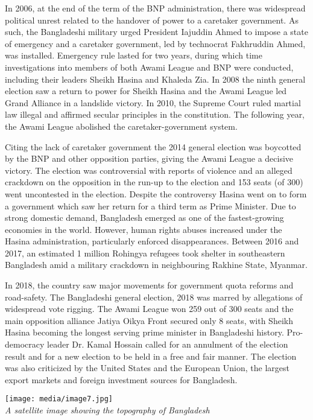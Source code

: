 In 2006, at the end of the term of the BNP administration, there was
widespread political unrest related to the handover of power to a
caretaker government. As such, the Bangladeshi military urged President
Iajuddin Ahmed to impose a state of emergency and a caretaker
government, led by technocrat Fakhruddin Ahmed, was installed. Emergency
rule lasted for two years, during which time investigations into members
of both Awami League and BNP were conducted, including their leaders
Sheikh Hasina and Khaleda Zia. In 2008 the ninth general election saw a
return to power for Sheikh Hasina and the Awami League led Grand
Alliance in a landslide victory. In 2010, the Supreme Court ruled
martial law illegal and affirmed secular principles in the constitution.
The following year, the Awami League abolished the caretaker-government
system.

Citing the lack of caretaker government the 2014 general election was
boycotted by the BNP and other opposition parties, giving the Awami
League a decisive victory. The election was controversial with reports
of violence and an alleged crackdown on the opposition in the run-up to
the election and 153 seats (of 300) went uncontested in the election.
Despite the controversy Hasina went on to form a government which saw
her return for a third term as Prime Minister. Due to strong domestic
demand, Bangladesh emerged as one of the fastest-growing economies in
the world. However, human rights abuses increased under the Hasina
administration, particularly enforced disappearances. Between 2016 and
2017, an estimated 1 million Rohingya refugees took shelter in
southeastern Bangladesh amid a military crackdown in neighbouring
Rakhine State, Myanmar.

In 2018, the country saw major movements for government quota reforms
and road-safety. The Bangladeshi general election, 2018 was marred by
allegations of widespread vote rigging. The Awami League won 259 out of
300 seats and the main opposition alliance Jatiya Oikya Front secured
only 8 seats, with Sheikh Hasina becoming the longest serving prime
minister in Bangladeshi history. Pro-democracy leader Dr. Kamal Hossain
called for an annulment of the election result and for a new election to
be held in a free and fair manner. The election was also criticized by
the United States and the European Union, the largest export markets and
foreign investment sources for Bangladesh.

\texttt{[image: media/image7.jpg]}\\
\emph{A satellite image showing the topography of Bangladesh}

